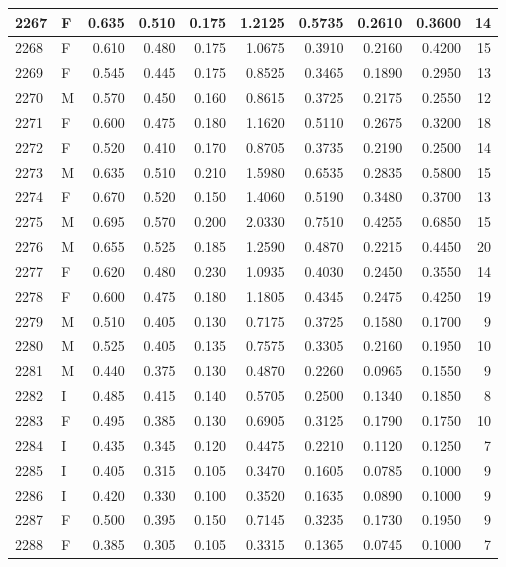 \documentclass[9pt,twocolumn,twoside,]{pnas-new}
\begin{document}
\begin{tabular}{l|l|r|r|r|r|r|r|r|r}
\hline
2267 & F & 0.635 & 0.510 & 0.175 & 1.2125 & 0.5735 & 0.2610 & 0.3600 & 14\\
\hline
2268 & F & 0.610 & 0.480 & 0.175 & 1.0675 & 0.3910 & 0.2160 & 0.4200 & 15\\
\hline
2269 & F & 0.545 & 0.445 & 0.175 & 0.8525 & 0.3465 & 0.1890 & 0.2950 & 13\\
\hline
2270 & M & 0.570 & 0.450 & 0.160 & 0.8615 & 0.3725 & 0.2175 & 0.2550 & 12\\
\hline
2271 & F & 0.600 & 0.475 & 0.180 & 1.1620 & 0.5110 & 0.2675 & 0.3200 & 18\\
\hline
2272 & F & 0.520 & 0.410 & 0.170 & 0.8705 & 0.3735 & 0.2190 & 0.2500 & 14\\
\hline
2273 & M & 0.635 & 0.510 & 0.210 & 1.5980 & 0.6535 & 0.2835 & 0.5800 & 15\\
\hline
2274 & F & 0.670 & 0.520 & 0.150 & 1.4060 & 0.5190 & 0.3480 & 0.3700 & 13\\
\hline
2275 & M & 0.695 & 0.570 & 0.200 & 2.0330 & 0.7510 & 0.4255 & 0.6850 & 15\\
\hline
2276 & M & 0.655 & 0.525 & 0.185 & 1.2590 & 0.4870 & 0.2215 & 0.4450 & 20\\
\hline
2277 & F & 0.620 & 0.480 & 0.230 & 1.0935 & 0.4030 & 0.2450 & 0.3550 & 14\\
\hline
2278 & F & 0.600 & 0.475 & 0.180 & 1.1805 & 0.4345 & 0.2475 & 0.4250 & 19\\
\hline
2279 & M & 0.510 & 0.405 & 0.130 & 0.7175 & 0.3725 & 0.1580 & 0.1700 & 9\\
\hline
2280 & M & 0.525 & 0.405 & 0.135 & 0.7575 & 0.3305 & 0.2160 & 0.1950 & 10\\
\hline
2281 & M & 0.440 & 0.375 & 0.130 & 0.4870 & 0.2260 & 0.0965 & 0.1550 & 9\\
\hline
2282 & I & 0.485 & 0.415 & 0.140 & 0.5705 & 0.2500 & 0.1340 & 0.1850 & 8\\
\hline
2283 & F & 0.495 & 0.385 & 0.130 & 0.6905 & 0.3125 & 0.1790 & 0.1750 & 10\\
\hline
2284 & I & 0.435 & 0.345 & 0.120 & 0.4475 & 0.2210 & 0.1120 & 0.1250 & 7\\
\hline
2285 & I & 0.405 & 0.315 & 0.105 & 0.3470 & 0.1605 & 0.0785 & 0.1000 & 9\\
\hline
2286 & I & 0.420 & 0.330 & 0.100 & 0.3520 & 0.1635 & 0.0890 & 0.1000 & 9\\
\hline
2287 & F & 0.500 & 0.395 & 0.150 & 0.7145 & 0.3235 & 0.1730 & 0.1950 & 9\\
\hline
2288 & F & 0.385 & 0.305 & 0.105 & 0.3315 & 0.1365 & 0.0745 & 0.1000 & 7\\

\end{tabular}
\end{document}

